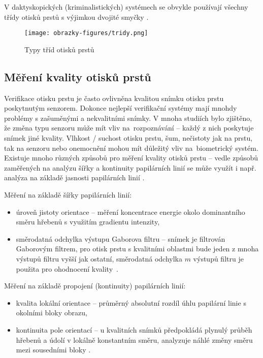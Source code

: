 V daktyskopických (kriminalistických) systémech se obvykle používají všechny třídy otisků prstů s výjimkou dvojité smyčky \cite{BIOopora}. 

\begin{figure}[!htbp]
    \centering
    \texttt{[image: obrazky-figures/tridy.png]}
    \caption{Typy tříd otisků prstů \cite{BIOopora}}
\end{figure}


\subsection{Měření kvality otisků prstů}
Verifikace otisku prstu je často ovlivněna kvalitou snímku otisku prstu poskytnutým senzorem. Dokonce nejlepší verifikační systémy mají mnohdy problémy s zašuměnými a nekvalitními snímky. V mnoha studiích bylo zjištěno, že změna typu senzoru může mít vliv na~rozpoznávání -- každý z nich poskytuje snímek jiné kvality. Vlhkost / suchost otisku prstu, šum, nečistoty jak na prstu, tak na senzoru nebo onemocnění mohou mít důležitý vliv na~biometrický systém. Existuje mnoho různých způsobů pro měření kvality otisků prstu -- vedle způsobů zaměřených na analýzu šířky a kontinuity papilárních linií se může využít i např. analýza na základě jasnosti papilárních linií \cite{FingerprintQuality}.

Měření na základě šířky papilárních linií:
\begin{itemize}
    \item úroveň jistoty orientace -- měření koncentrace energie okolo dominantního směru hřebenů s využitím gradientu intenzity,
    \item směrodatná odchylka výstupu Gaborova filtru -- snímek je filtrován Gaborovým filtrem, pro otisk prstu s kvalitními oblastmi bude jeden z mnoha výstupů filtru vyšší jak ostatní, směrodatná odchylka $m$ výstupů filtru je použita pro ohodnocení kvality~\cite{FingerprintQuality}.
\end{itemize}

Měření na základě propojení (kontinuity) papilárních linií:
\begin{itemize}
    \item kvalita lokální orientace -- průměrný absolutní rozdíl úhlu papilární linie s okolními bloky obrazu,
    \item kontinuita pole orientací -- u kvalitních snímků předpokládá plynulý průběh hřebenů a údolí v lokálně konstantním směru, analyzuje náhlé změny směru mezi sousedními bloky \cite{FingerprintQuality}.
\end{itemize}




